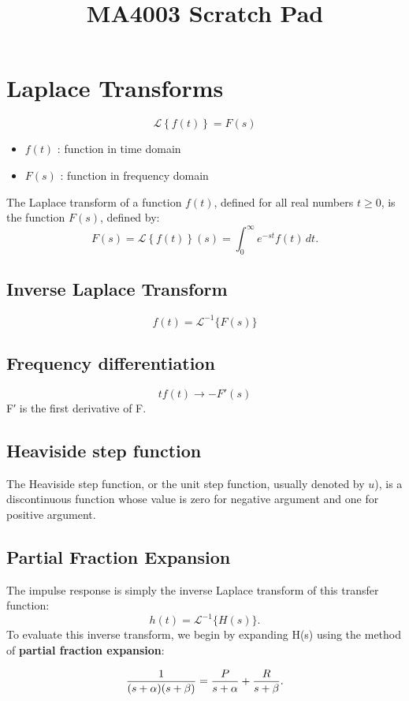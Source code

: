 \documentclass[]{article}
\title{MA4003 Scratch Pad}
\author{}
\begin{document}
\maketitle

\section{Laplace Transforms}

\[\mathcal{L}\left\{f(t)\right\} = F(s)\]
\begin{itemize}
\item $f(t)$ : function in time domain
\item $F(s)$ : function in frequency domain
\end{itemize}
The Laplace transform of a function $f(t)$, defined for all real numbers $t \geq 0$, is the function $F(s)$, defined by:
\[F(s) = \mathcal{L} \left\{f(t)\right\}(s)=\int_0^{\infty} e^{-st} f(t) \,dt. \]
\subsection{Inverse Laplace Transform}
\[
f(t) = \mathcal{L}^{-1} \{F(s)\} \]

\subsection{Frequency differentiation}	 
\[t f(t)  \rightarrow 	 -F'(s) \] 	
F′ is the first derivative of F.

\subsection{Heaviside step function}	 
The Heaviside step function, or the unit step function, usually denoted by $u$), is a discontinuous function whose value is zero for negative argument and one for positive argument. 

\subsection{Partial Fraction Expansion}
The impulse response is simply the inverse Laplace transform of this transfer function:
\[h(t) = \mathcal{L}^{-1}\{H(s)\}.\]
To evaluate this inverse transform, we begin by expanding H(s) using the method of \textbf{partial fraction expansion}:

\[\frac{1}{(s+\alpha)(s+\beta)} = { P \over s+\alpha } + { R  \over s+\beta }.\]
\end{document}

